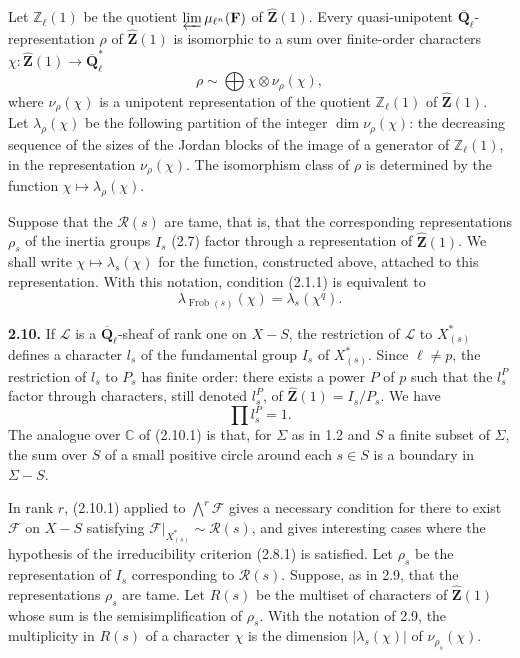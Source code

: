 \documentclass[11pt]{article}
\newcommand{\F}{\mathbf{F}}
\newcommand{\Qbl}{\overline{\mathbf{Q}}_{\ell}}
\newcommand{\Frob}{\operatorname{Frob}}
\newcommand{\Z}{\mathbb{Z}}
\newcommand{\Zhat}{\widehat{\mathbf{Z}}}
\newcommand{\C}{\mathbb{C}}
\newcommand{\Rcal}{\mathcal{R}}
\newcommand{\Fcal}{\mathcal{F}}
\newcommand{\Lcal}{\mathcal{L}}
\newcommand{\para}[1]{\medskip\noindent\textbf{#1}\enspace}
\begin{document}
Let \(\Z_\ell(1)\) be the quotient \(\varprojlim \mu_{\ell^n}(\F)\) of \(\Zhat(1)\). Every quasi-unipotent \(\Qbl\)-representation \(\rho\) of \(\Zhat(1)\) is isomorphic to a sum over finite-order characters \(\chi:\Zhat(1)\to \Qbl^*\)
\begin{equation}
\rho\sim\bigoplus \chi\otimes \nu_\rho(\chi),
\tag{2.9.4}
\end{equation}
where \(\nu_\rho(\chi)\) is a unipotent representation of the quotient \(\Z_\ell(1)\) of \(\Zhat(1)\). Let \(\lambda_\rho(\chi)\) be the following partition of the integer \(\dim \nu_\rho(\chi)\): the decreasing sequence of the sizes of the Jordan blocks of the image of a generator of \(\Z_\ell(1)\), in the representation \(\nu_\rho(\chi)\). The isomorphism class of \(\rho\) is determined by the function \(\chi\mapsto\lambda_\rho(\chi)\).

Suppose that the \(\Rcal(s)\) are tame, that is, that the corresponding representations \(\rho_s\) of the inertia groups \(I_s\) (2.7) factor through a representation of \(\Zhat(1)\). We shall write \(\chi\mapsto\lambda_s(\chi)\) for the function, constructed above, attached to this representation. With this notation, condition (2.1.1) is equivalent to
\begin{equation}
\lambda_{\Frob(s)}(\chi)=\lambda_s(\chi^q).
\tag{2.9.5}
\end{equation}

\para{2.10.} If \(\Lcal\) is a \(\Qbl\)-sheaf of rank one on \(X-S\), the restriction of \(\Lcal\) to \(X^*_{(s)}\) defines a character \(l_s\) of the fundamental group \(I_s\) of \(X^*_{(s)}\). Since \(\ell\ne p\), the restriction of \(l_s\) to \(P_s\) has finite order: there exists a power \(P\) of \(p\) such that the \(l_s^P\) factor through characters, still denoted \(l_s^P\), of \(\Zhat(1)=I_s/P_s\). We have
\begin{equation}
\prod l_s^P=1.
\tag{2.10.1}
\end{equation}
The analogue over \(\C\) of (2.10.1) is that, for \(\Sigma\) as in 1.2 and \(S\) a finite subset of \(\Sigma\), the sum over \(S\) of a small positive circle around each \(s\in S\) is a boundary in \(\Sigma-S\).

In rank \(r\), (2.10.1) applied to \(\bigwedge^r\Fcal\) gives a necessary condition for there to exist \(\Fcal\) on \(X-S\) satisfying \(\Fcal|_{X^*_{(s)}}\sim\Rcal(s)\), and gives interesting cases where the hypothesis of the irreducibility criterion (2.8.1) is satisfied. Let \(\rho_s\) be the representation of \(I_s\) corresponding to \(\Rcal(s)\). Suppose, as in 2.9, that the representations \(\rho_s\) are tame. Let \(R(s)\) be the multiset of characters of \(\Zhat(1)\) whose sum is the semisimplification of \(\rho_s\). With the notation of 2.9, the multiplicity in \(R(s)\) of a character \(\chi\) is the dimension \(|\lambda_s(\chi)|\) of \(\nu_{\rho_s}(\chi)\).
\end{document}
